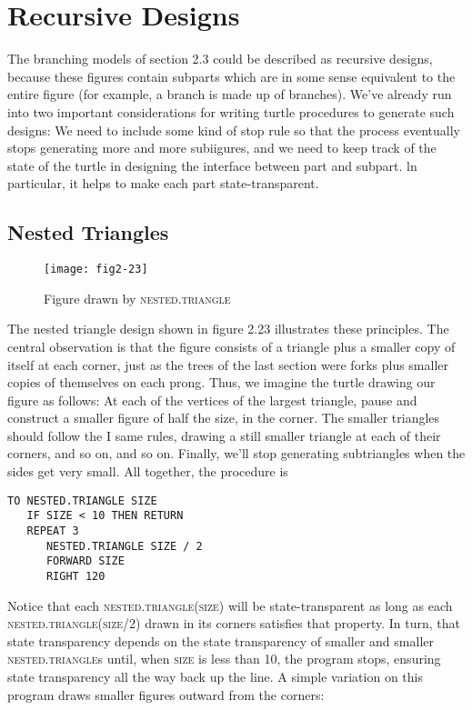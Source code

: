 \documentclass{book}
\begin{document}
\section{Recursive Designs}

The branching models of section 2.3 could be described as recursive
designs, because these figures contain subparts which are in some sense
equivalent to the entire figure (for example, a branch is made up of
branches). We've already run into two important considerations for
writing turtle procedures to generate such designs: We need to include
some kind of stop rule so that the process eventually stops generating
more and more subiigures, and we need to keep track of the state of the
turtle in designing the interface between part and subpart. ln particular,
it helps to make each part state-transparent.

\subsection{Nested Triangles}

\begin{figure}
\begin{center}
\texttt{[image: fig2-23]}
\caption{Figure drawn by \textsc{nested}\textsc{.triangle}}
\end{center}
\end{figure}

The nested triangle design shown in figure 2.23 illustrates these principles. The central observation is that the figure consists of a triangle
plus a smaller copy of itself at each corner, just as the trees of the
last section were forks plus smaller copies of themselves on each prong.
Thus, we imagine the turtle drawing our figure as follows: At each of
the vertices of the largest triangle, pause and construct a smaller figure
of half the size, in the corner. The smaller triangles should follow the
I same rules, drawing a still smaller triangle at each of their corners, and
so on, and so on. Finally, we'll stop generating subtriangles when the
sides get very small. All together, the procedure is

\begin{verbatim}
TO NESTED.TRIANGLE SIZE
   IF SIZE < 10 THEN RETURN
   REPEAT 3
      NESTED.TRIANGLE SIZE / 2
      FORWARD SIZE
      RIGHT 120
\end{verbatim}
Notice that each \textsc{nested}\textsc{.triangle(size)} will be state-transparent as
long as each \textsc{nested}\textsc{.triangle}\textsc{(size/2)} drawn in its corners satisfies
that property. In turn, that state transparency depends on the state
transparency of smaller and smaller \textsc{nested}\textsc{.triangle}s until, when \textsc{size}
is less than 10, the program stops, ensuring state transparency all the
way back up the line. A simple variation on this program draws smaller
figures outward from the corners:
\end{document}
